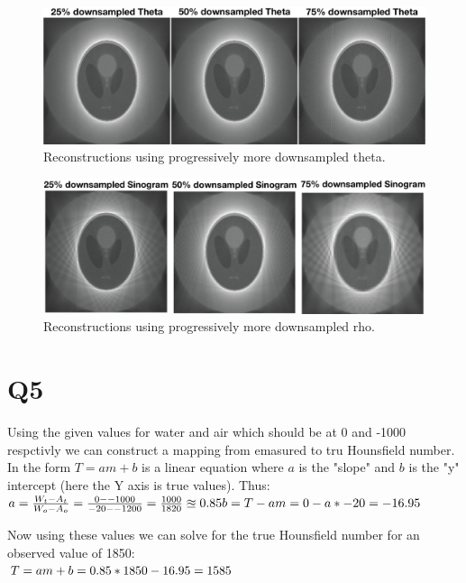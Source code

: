 \documentclass[12pt]{article}
\begin{document}
\begin{figure}[H]
	\includegraphics[width=\textwidth]{downtheta.png}
	\caption{Reconstructions using progressively more downsampled theta.}
	\label{dtheta}
\end{figure}
\begin{figure}[H]
	\includegraphics[width=\textwidth]{downrho.png}
	\caption{Reconstructions using progressively more downsampled rho.}
	\label{drho}
\end{figure}
\section{Q5}
Using the given values for water and air which should be at 0 and -1000 respctivly we can construct a mapping from emasured to tru Hounsfield number. In the form $T = am + b$ is a linear equation where $a$ is the "slope" and $b$ is the "y" intercept (here the Y axis is true values). Thus:\\
$
a = \frac{W_t - A_t}{W_o - A_o} = \frac{0 - -1000}{-20 - -1200} = \frac{1000}{1820} \approxeq 0.85\\
b = T - am = 0 - a*-20 = -16.95\\$

Now using these values we can solve for the true Hounsfield number for an observed value of 1850:\\
$T = am + b = 0.85 * 1850 - 16.95 = 1585\\$

 
\end{document}
